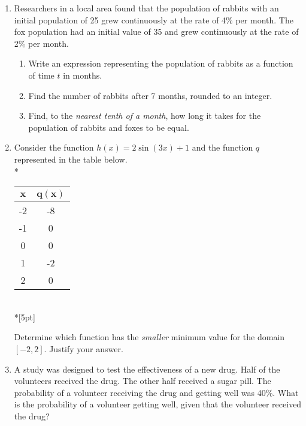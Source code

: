 \documentclass[12pt, oneside]{article}
\begin{document}
\begin{enumerate}
\newpage

\item Researchers in a local area found that the population of rabbits with an initial population of 25 grew continuously at the rate of 4\% per month. The fox population had an initial value of 35 and grew continuously at the rate of 2\% per month.
\begin{enumerate}
    \item Write an expression representing the population of rabbits as a function of time $t$ in months.\\[1in] 
    \item Find the number of rabbits after 7 months, rounded to an integer.\\[2in] 
    \item Find, to the \emph{nearest tenth of a month}, how long it takes for the population of rabbits and foxes to be equal.
\end{enumerate} %

\newpage
\item Consider the function $h(x) = 2\sin(3x) + 1$ and the function $q$ represented in the table below.\\*
\begin{center}
\begin{tabular}{|c|c|}
    \hline 
    $\boldsymbol{x}$ & $\boldsymbol{q(x)}$\\ 
    \hline 
    -2 & -8 \\ 
    \hline 
    -1 & 0 \\ 
    \hline 
    0 & 0 \\ 
    \hline 
    1 & -2 \\ 
    \hline 
    2 & 0 \\ 
    \hline 
\end{tabular}\\*[5pt]
\end{center}
Determine which function has the \emph{smaller} minimum value for the domain $[-2,2]$. Justify your answer. \\[2in]%

\item A study was designed to test the effectiveness of a new drug. Half of the volunteers received the drug. The other half received a sugar pill. The probability of a volunteer receiving the drug and getting well was 40\%. What is the probability of a volunteer getting well, given that the volunteer received the drug? %



\end{enumerate}
\end{document}
